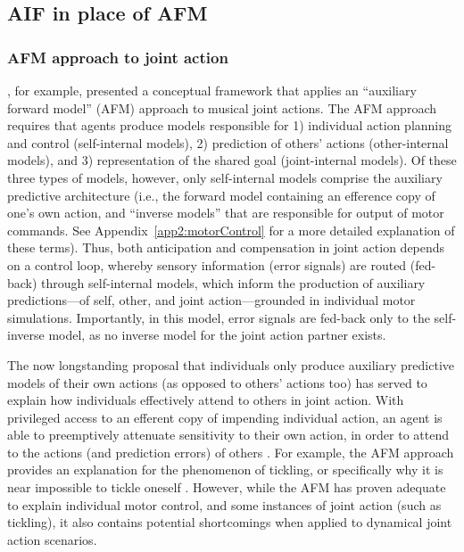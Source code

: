 \subsection{AIF in place of AFM}



\subsubsection{AFM approach to joint action\label{app2:AFMapproachJA}}
 \textcite{Keller2016}, for example, presented a conceptual framework that applies an ``auxiliary forward model'' (AFM) approach to musical joint actions.  The AFM approach requires that agents produce models responsible for 1) individual action planning and control (self-internal models), 2) prediction of others' actions (other-internal models), and 3) representation of the shared goal (joint-internal models).  Of these three types of models, however, only self-internal models comprise the auxiliary predictive architecture (i.e., the forward model containing an efference copy of one's own action, and ``inverse models'' that are responsible for output of motor commands. See Appendix~\ref{app2:motorControl} for a more detailed explanation of these terms).  Thus, both anticipation and compensation in joint action depends on a control loop, whereby sensory information (error signals) are routed (fed-back) through self-internal models, which inform the production of auxiliary predictions---of self, other, and joint action---grounded in individual motor simulations.  Importantly, in this model,  error signals are fed-back only to the self-inverse model, as no inverse model for the joint action partner exists.

The now longstanding proposal that individuals only produce auxiliary predictive models of their own actions (as opposed to others' actions too) has served to explain how individuals effectively attend to others in joint action.  With privileged access to an efferent copy of impending individual action, an agent is able to preemptively attenuate sensitivity to their own action, in order to attend to the actions (and prediction errors) of others \citep{Wolpert1998}.  For example, the AFM approach provides an explanation for the phenomenon of tickling, or specifically why it is near impossible to tickle oneself \citep[due to sensory attenuation resulting from the self-generated predictions about the consequences of action][]{Blakemore2003}. However, while the AFM has proven adequate to explain individual motor control, and some instances of joint action (such as tickling), it also contains potential shortcomings when applied to dynamical joint action scenarios.

